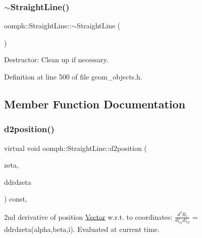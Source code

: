\subsubsection{\texorpdfstring{$\sim$\+Straight\+Line()}{~StraightLine()}}
{\footnotesize\ttfamily oomph\+::\+Straight\+Line\+::$\sim$\+Straight\+Line (\begin{DoxyParamCaption}{ }\end{DoxyParamCaption})\hspace{0.3cm}{\ttfamily [inline]}}



Destructor\+: Clean up if necessary. 



Definition at line 500 of file geom\+\_\+objects.\+h.



\subsection{Member Function Documentation}
\mbox{\label{classoomph_1_1StraightLine_ad4a437deb740dcc4c55b69e52e98d2d5}} 
\subsubsection{\texorpdfstring{d2position()}{d2position()}\hspace{0.1cm}{\footnotesize\ttfamily [1/2]}}
{\footnotesize\ttfamily virtual void oomph\+::\+Straight\+Line\+::d2position (\begin{DoxyParamCaption}\item[{const \hyperlink{classoomph_1_1Vector}{Vector}$<$ double $>$ \&}]{zeta,  }\item[{\hyperlink{classoomph_1_1RankThreeTensor}{Rank\+Three\+Tensor}$<$ double $>$ \&}]{ddrdzeta }\end{DoxyParamCaption}) const\hspace{0.3cm}{\ttfamily [inline]}, {\ttfamily [virtual]}}



2nd derivative of position \hyperlink{classoomph_1_1Vector}{Vector} w.\+r.\+t. to coordinates\+: $ \frac{d^2R_i}{d \zeta_\alpha d \zeta_\beta}$ = ddrdzeta(alpha,beta,i). Evaluated at current time. 




